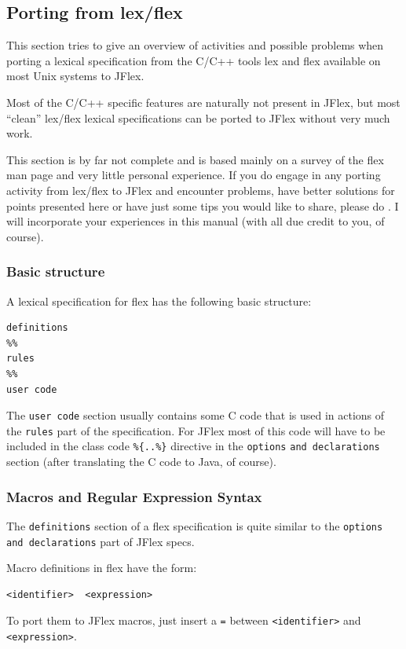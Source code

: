 \documentclass[11pt]{scrartcl}
\begin{document}
\subsection{Porting from lex/flex}\label{lexport}
This section tries to give an overview of activities and possible
problems when porting a lexical specification from the C/C++ tools lex
and flex \cite{flex} available on most Unix systems to JFlex.

Most of the C/C++ specific features are naturally not present in JFlex,
but most ``clean'' lex/flex lexical specifications can be ported to 
JFlex without very much work.

This section is by far not complete and is based mainly on a survey of
the flex man page and very little personal experience.  If you do
engage in any porting activity from lex/flex to JFlex and encounter
problems, have better solutions for points presented here or have just
some tips you would like to share, please do 
%
. I will
incorporate your experiences in this manual (with all due credit to you,
of course).

\subsubsection{Basic structure}
A lexical specification for flex has the following basic structure:
\begin{verbatim}
definitions
%%
rules
%%
user code
\end{verbatim}

The \texttt{user code} section usually contains some C code that is used
in actions of the \texttt{rules} part of the specification. For JFlex most
of this code will have to be included in the class code \verb+%{..%}+
directive in the \texttt{options} \texttt{and dec\-la\-ra\-ti\-ons} section (after 
translating the C code to Java, of course). 

\subsubsection{Macros and Regular Expression Syntax}
The \texttt{definitions} section of a flex specification is quite similar
to the \texttt{op\-tions and dec\-la\-ra\-tions} part of JFlex specs.

Macro definitions in flex have the form:
\begin{verbatim}
<identifier>  <expression>
\end{verbatim}
To port them to JFlex macros, just insert a \texttt{=} between \texttt{<identifier>}
and \texttt{<expression>}.
\end{document}
